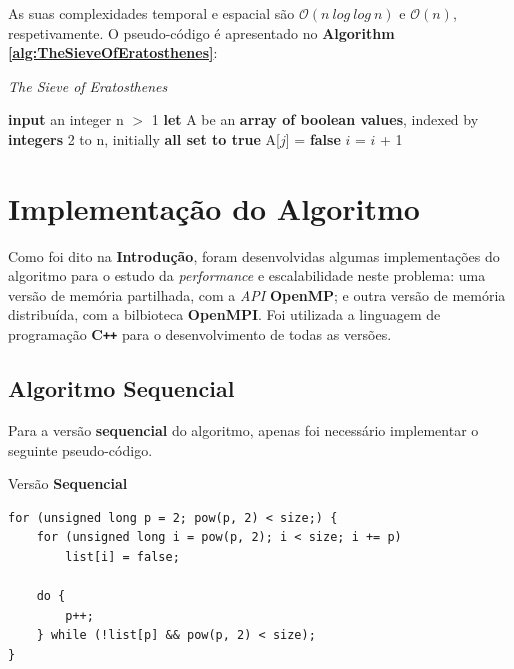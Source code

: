 \documentclass[a4paper]{article}
\begin{document}
As suas complexidades temporal e espacial são $\mathcal{O}(n\ log\ log\ n)$ e $\mathcal{O}(n)$, respetivamente. O pseudo-código é apresentado no \textbf{Algorithm \ref{alg:TheSieveOfEratosthenes}}:

\pagebreak

\begin{algorithm}
\caption{\textit{The Sieve of Eratosthenes}}
\label{alg:TheSieveOfEratosthenes}
\begin{algorithmic}[1]
\State\textbf{input} an integer n $>$ 1
\State\textbf{let} A be an \textbf{array of boolean values}, indexed by \textbf{integers} 2 to n, initially \textbf{all set to true}\linebreak
{}
\State A[$j$] = \textbf{false}
\EndFor
\Do
\State $i$ = $i$ + 1
\EndFor
\end{algorithmic}
\end{algorithm}
 
\section{Implementação do Algoritmo}
 
Como foi dito na \textbf{Introdução}, foram desenvolvidas algumas implementações do algoritmo para o estudo da \textit{performance} e escalabilidade neste problema: uma versão de memória partilhada, com a \textit{API} \textbf{OpenMP}; e outra versão de memória distribuída, com a bilbioteca \textbf{OpenMPI}. Foi utilizada a linguagem de programação \textbf{C\texttt{++}} para o desenvolvimento de todas as versões.
 
\subsection{Algoritmo Sequencial}
 
Para a versão \textbf{sequencial} do algoritmo, apenas foi necessário implementar o seguinte pseudo-código.

\begin{algorithm}
\caption{Versão \textbf{Sequencial}}
\label{alg:SequentialSieve}
\begin{lstlisting}
for (unsigned long p = 2; pow(p, 2) < size;) {
	for (unsigned long i = pow(p, 2); i < size; i += p)
		list[i] = false;

	do {
		p++;
	} while (!list[p] && pow(p, 2) < size);
}
\end{lstlisting}
\end{algorithm}
\end{document}
